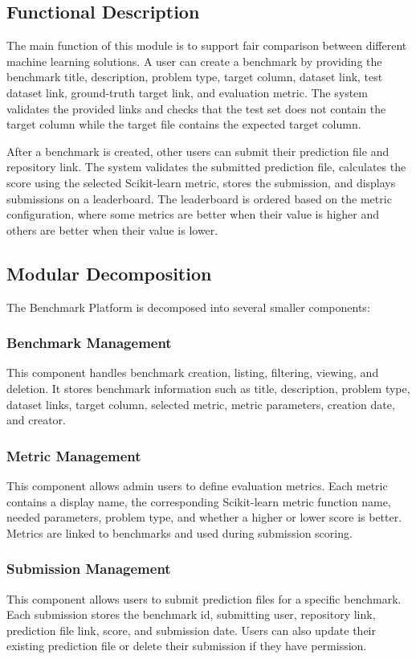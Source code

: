 \documentclass[12pt,a4paper]{report}
\begin{document}
\subsection{Functional Description}
\noindent The main function of this module is to support fair comparison
between different machine learning solutions. A user can create a benchmark by
providing the benchmark title, description, problem type, target column,
dataset link, test dataset link, ground-truth target link, and evaluation
metric. The system validates the provided links and checks that the test set
does not contain the target column while the target file contains the expected
target column.

\noindent After a benchmark is created, other users can submit their prediction
file and repository link. The system validates the submitted prediction file,
calculates the score using the selected Scikit-learn metric, stores the
submission, and displays submissions on a leaderboard. The leaderboard is
ordered based on the metric configuration, where some metrics are better when
their value is higher and others are better when their value is lower.

\subsection{Modular Decomposition}
\noindent The Benchmark Platform is decomposed into several smaller components:

\subsubsection{Benchmark Management}
\noindent This component handles benchmark creation, listing, filtering, viewing,
and deletion. It stores benchmark information such as title, description,
problem type, dataset links, target column, selected metric, metric parameters,
creation date, and creator.

\subsubsection{Metric Management}
\noindent This component allows admin users to define evaluation metrics. Each
metric contains a display name, the corresponding Scikit-learn metric function
name, needed parameters, problem type, and whether a higher or lower score is
better. Metrics are linked to benchmarks and used during submission scoring.

\subsubsection{Submission Management}
\noindent This component allows users to submit prediction files for a specific
benchmark. Each submission stores the benchmark id, submitting user, repository
link, prediction file link, score, and submission date. Users can also update
their existing prediction file or delete their submission if they have
permission.
\end{document}
